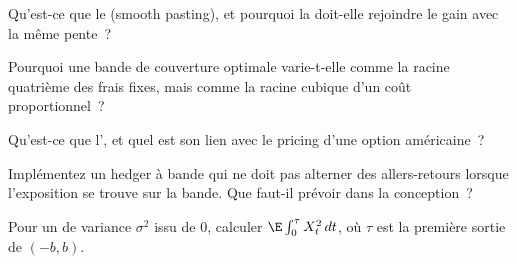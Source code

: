 \begin{interviewq}\label{iq:qm:optimal-stopping-and-impulse-control:2}
Qu'est-ce que le  (smooth pasting), et pourquoi la  doit-elle rejoindre le gain avec la même pente~?
\end{interviewq}

\begin{interviewq}\label{iq:qm:optimal-stopping-and-impulse-control:3}
Pourquoi une bande de couverture optimale varie-t-elle comme la racine quatrième des frais fixes, mais comme la racine cubique d'un coût proportionnel~?
\end{interviewq}

\begin{interviewq}\label{iq:qm:optimal-stopping-and-impulse-control:4}
Qu'est-ce que l', et quel est son lien avec le pricing d'une option américaine~?
\end{interviewq}

\begin{interviewq}\label{iq:qm:optimal-stopping-and-impulse-control:5}
Implémentez un hedger à bande qui ne doit pas alterner des allers-retours lorsque l'exposition se trouve sur la bande. Que faut-il prévoir dans la conception~?
\end{interviewq}

\begin{interviewq}\label{iq:qm:optimal-stopping-and-impulse-control:6}
Pour un  de variance $\sigma^2$ issu de 0, calculer $\E\int_0^\tau X_t^2\,dt$, où $\tau$ est la première sortie de $(-b, b)$.
\end{interviewq}
